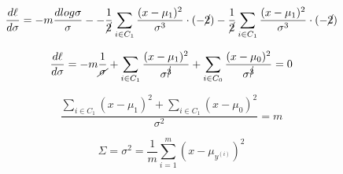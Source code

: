 \documentclass{article}
\begin{document}
\begin{equation*}
    \frac{d\ell}{d\sigma} = - m \frac{dlog\sigma}{\sigma} -
    - \frac1{\cancel{2}} \sum_{i \in C_1} \frac {(x - \mu_1)^2}{\sigma^3} \cdot (-\cancel{2})
    - \frac1{\cancel{2}} \sum_{i \in C_1} \frac {(x - \mu_1)^2}{\sigma^3} \cdot (-\cancel{2})
\end{equation*}

\begin{equation*}
    \frac{d\ell}{d\sigma} = - m \frac1{\cancel{\sigma} }
    + \sum_{i \in C_1} \frac {(x - \mu_1)^2}{\sigma^{\cancel{3}}}
    + \sum_{i \in C_0} \frac {(x - \mu_0)^2}{\sigma^{\cancel{3}}}
    = 0
\end{equation*}

\begin{equation*}
    \frac
        {
            \sum_{i \in C_1} (x - \mu_1)^2 +
            \sum_{i \in C_1} (x - \mu_0)^2
        }
        {\sigma^2}
    = m
\end{equation*}


\begin{equation*}
    \Sigma = \sigma^2 = \frac 1m \sum_{i=1}^m (x - \mu_{y^{(i)}})^2
\end{equation*}
\end{document}
